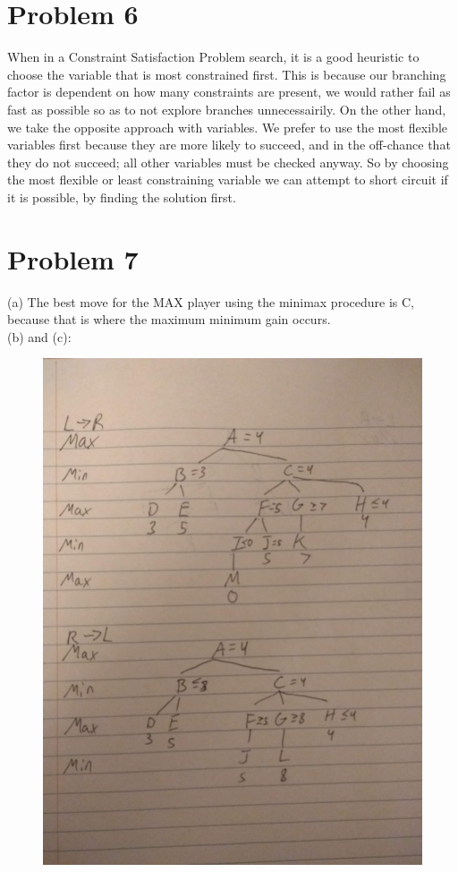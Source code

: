\documentclass[12pt]{article}
\begin{document}
\section *{Problem 6}
When in a Constraint Satisfaction Problem search, it is a good heuristic to choose the variable that is most constrained first. This is because our branching factor is dependent on how many constraints are present, we would rather fail as fast as possible so as to not explore branches unnecessairily. On the other hand, we take the opposite approach with variables. We prefer to use the most flexible variables first because they are more likely to succeed, and in the off-chance that they do not succeed; all other variables must be checked anyway. So by choosing the most flexible or least constraining variable we can attempt to short circuit if it is possible, by finding the solution first.


\section *{Problem 7}
(a) The best move for the MAX player using the minimax procedure is C, because that is where the maximum minimum gain occurs. \\
(b) and (c):
\begin{figure}[!htb]
	\centering
	\includegraphics[width=.5\textwidth,angle=270, origin=c]{problem7.jpg}
\end{figure} 
\newpage
\end{document}

